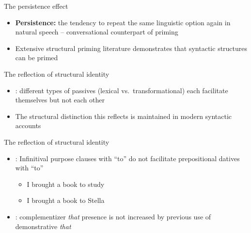 \documentclass{digs-slides}
\newcommand{\includegraph}[1]{\mode<beamer>{}
    \mode<handout>{}}
\begin{document}
\begin{frame}{The persistence effect}
	\begin{itemize}
       		\item \textbf{Persistence:} the tendency to repeat the same linguistic option again in natural speech -- conversational counterpart of priming
		\item Extensive structural priming
                  literature \parencite[beginning with][]{Bock:1986}
                  demonstrates that syntactic structures can be primed
			\end{itemize}
\end{frame}

\begin{frame}{The reflection of structural identity}
	\begin{itemize}
          \item \textcite{Estival:1985}: different types of passives (lexical vs.\ transformational) each facilitate themselves but not each other
          \item The structural distinction this reflects is maintained in modern syntactic accounts \parencite[e.g.][]{Embick:2004}
	\end{itemize}
        \begin{center}
            \includegraph{figures/estival}
        \end{center}
\end{frame}


\begin{frame}{The reflection of structural identity} %
	\begin{itemize}
          \item \textcite{Bock:1990}: Infinitival purpose clauses with
            “to” do not facilitate prepositional datives with “to”
            \begin{itemize}
              \item I brought a book to study
              \item I brought a book to Stella
            \end{itemize}
          \item \textcite{Ferreira:2003}: complementizer \textit{that}
            presence is not increased by previous use of demonstrative \textit{that}
	\end{itemize}
\end{frame}
\end{document}
